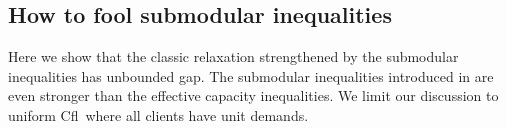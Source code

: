 \documentclass[11pt]{article}
\newcommand{\cfl}{{\sc Cfl}}
\begin{document}
\begin{comment}
We modify  the construction of  Lemma \ref{assi-sym} in  the following
way: facility  $a_{i'}$ is  opened $100\%$ of  the time but  is active
$1-\sum_{i\in  Costly}y'_{i}$ of  the time,  when none  of  the costly
facilities  are  opened.  When it  is  not  active,  the capacity  of  its
corresponding bin is $0$. When a costly other than $i_{co'}$ is opened
the  experiment is  the same  as  in Lemma  \ref{assi-sym}. If  costly
facility $i_{co'}$ is opened the  capacity of the corresponding bin is
$w^2_{co'}=\frac{\sum_{j}x'_{co'j}}{y'_{i_{co'}}}$  and the  capacity of
the  cheap  is  $\frac{|C|-w^2_{co'}}{n}$.  We randomly  select   some
$w^2_{co'}$ clients  that do not belong  to $J^*$ to be  tossed in the
bin of $i_{co'};$ we randomly
distribute  the balls corresponding  to the  remaining clients  to the
slots of  the cheap facilities. When  $a_{i'}$ is active,  and thus no
costly facility  is opened, the  capacity of the corresponding  bin is
$w^1_{a_{i'}}=\frac{\sum_j  x'_{a_{i'}j}}{1-\sum_{i\in  Costly}y'_{i}}$
and the capacity of the cheap is $\frac{|C|-w^1_{a_{i'}}}{n}$. We select
randomly  some  $w^1_{a_{i'}}$  clients  in  $J^*$  and  we  toss  the
corresponding balls in the bin of $a_{i'}$.  We randomly toss the
remaining balls to the slots of the bins of the cheap facilities.

Note that  the above experiment  induces a distribution  over feasible
integer solutions since  all the defined bin capacities  are less than
$U$ (this is by  the choice of the size of $J^*$)  and every client is
assigned to exactly one opened facility in each outcome.  We do not need
this distribution to be assignment-symmetric. Observe that the expected
vector   with  respect   to  the   latter  distribution   is  solution
$s'$. Finally, note that we  once again treated the capacities $w$ of
the bins  as
being integral.  For fractional bin capacities (which is
actually  always the case  for the  defined $w$'s)  we can  define the
experiment in a similar way to the proof of Lemma \ref{assi-sym}.  
\end{proof}

\end{comment}





\subsection{How to fool submodular inequalities} 

Here we show that the classic relaxation strengthened by the
submodular inequalities has unbounded gap. The submodular inequalities
introduced in \cite{AardalPW95} are even stronger than the effective
capacity inequalities. We limit our discussion to uniform \cfl\ where
all clients have unit demands. 
\end{document}
